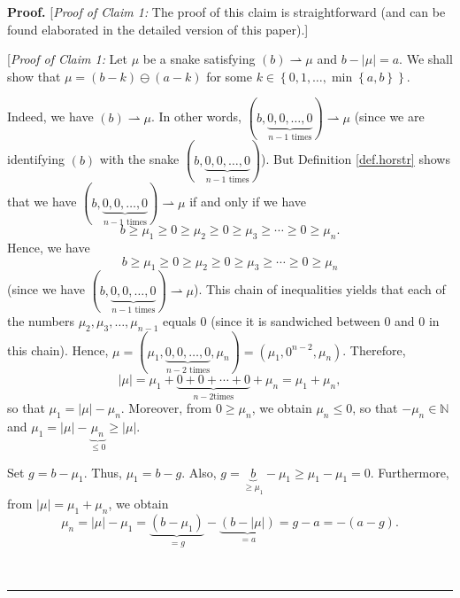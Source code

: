 \documentclass[numbers=enddot,12pt,final,onecolumn,notitlepage]{scrartcl}%
\theoremstyle{definition}
\newenvironment{proof}[1][Proof]{\noindent\textbf{#1.} }{\ \rule{0.5em}{0.5em}}
\newenvironment{verlong}{}{}
\newenvironment{vershort}{}{}
\begin{document}
\begin{proof}
\begin{vershort}
[\textit{Proof of Claim 1:} The proof of this claim is straightforward (and
can be found elaborated in the detailed version \cite{verlong} of this paper).]
\end{vershort}

\begin{verlong}
[\textit{Proof of Claim 1:} Let $\mu$ be a snake satisfying $\left(  b\right)
\rightharpoonup\mu$ and $b-\left\vert \mu\right\vert =a$. We shall show that
$\mu=\left(  b-k\right)  \ominus\left(  a-k\right)  $ for some $k\in\left\{
0,1,\ldots,\min\left\{  a,b\right\}  \right\}  $.

Indeed, we have $\left(  b\right)  \rightharpoonup\mu$. In other words,
$\left(  b,\underbrace{0,0,\ldots,0}_{n-1\text{ times}}\right)
\rightharpoonup\mu$ (since we are identifying $\left(  b\right)  $ with the
snake $\left(  b,\underbrace{0,0,\ldots,0}_{n-1\text{ times}}\right)  $). But
Definition \ref{def.horstr} shows that we have $\left(
b,\underbrace{0,0,\ldots,0}_{n-1\text{ times}}\right)  \rightharpoonup\mu$ if
and only if we have%
\[
b\geq\mu_{1}\geq0\geq\mu_{2}\geq0\geq\mu_{3}\geq\cdots\geq0\geq\mu_{n}.
\]
Hence, we have%
\[
b\geq\mu_{1}\geq0\geq\mu_{2}\geq0\geq\mu_{3}\geq\cdots\geq0\geq\mu_{n}%
\]
(since we have $\left(  b,\underbrace{0,0,\ldots,0}_{n-1\text{ times}}\right)
\rightharpoonup\mu$). This chain of inequalities yields that each of the
numbers $\mu_{2},\mu_{3},\ldots,\mu_{n-1}$ equals $0$ (since it is sandwiched
between $0$ and $0$ in this chain). Hence, $\mu=\left(  \mu_{1}%
,\underbrace{0,0,\ldots,0}_{n-2\text{ times}},\mu_{n}\right)  =\left(  \mu
_{1},0^{n-2},\mu_{n}\right)  $. Therefore,
\[
\left\vert \mu\right\vert =\mu_{1}+\underbrace{0+0+\cdots+0}_{n-2\text{
times}}+\mu_{n}=\mu_{1}+\mu_{n},
\]
so that $\mu_{1}=\left\vert \mu\right\vert -\mu_{n}$. Moreover, from $0\geq
\mu_{n}$, we obtain $\mu_{n}\leq0$, so that $-\mu_{n}\in\mathbb{N}$ and
$\mu_{1}=\left\vert \mu\right\vert -\underbrace{\mu_{n}}_{\leq0}\geq\left\vert
\mu\right\vert $.

Set $g=b-\mu_{1}$. Thus, $\mu_{1}=b-g$. Also, $g=\underbrace{b}_{\geq\mu_{1}%
}-\mu_{1}\geq\mu_{1}-\mu_{1}=0$. Furthermore, from $\left\vert \mu\right\vert
=\mu_{1}+\mu_{n}$, we obtain%
\[
\mu_{n}=\left\vert \mu\right\vert -\mu_{1}=\underbrace{\left(  b-\mu
_{1}\right)  }_{=g}-\underbrace{\left(  b-\left\vert \mu\right\vert \right)
}_{=a}=g-a=-\left(  a-g\right)  .
\]



\end{verlong}
\end{proof}
\end{document}
